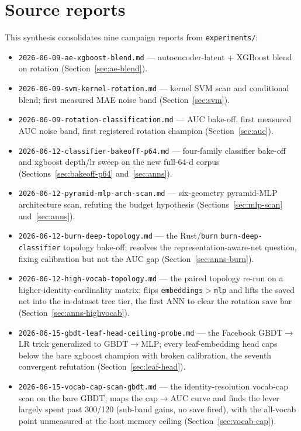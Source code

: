 \documentclass[11pt]{article}
\begin{document}
\section{Source reports}
This synthesis consolidates nine campaign reports from \texttt{experiments/}:
\begin{itemize}
  \item \texttt{2026-06-09-ae-xgboost-blend.md} --- autoencoder-latent +
    XGBoost blend on rotation (Section~\ref{sec:ae-blend}).
  \item \texttt{2026-06-09-svm-kernel-rotation.md} --- kernel SVM scan and
    conditional blend; first measured MAE noise band (Section~\ref{sec:svm}).
  \item \texttt{2026-06-09-rotation-classification.md} --- AUC bake-off, first
    measured AUC noise band, first registered rotation champion
    (Section~\ref{sec:auc}).
  \item \texttt{2026-06-12-classifier-bakeoff-p64.md} --- four-family
    classifier bake-off and xgboost depth/lr sweep on the new full-64-d corpus
    (Sections~\ref{sec:bakeoff-p64} and~\ref{sec:anns}).
  \item \texttt{2026-06-12-pyramid-mlp-arch-scan.md} --- six-geometry
    pyramid-MLP architecture scan, refuting the budget hypothesis
    (Sections~\ref{sec:mlp-scan} and~\ref{sec:anns}).
  \item \texttt{2026-06-12-burn-deep-topology.md} --- the Rust/\texttt{burn}
    \texttt{burn-deep-classifier} topology bake-off; resolves the
    representation-aware-net question, fixing calibration but not the AUC gap
    (Section~\ref{sec:anns-burn}).
  \item \texttt{2026-06-12-high-vocab-topology.md} --- the paired topology
    re-run on a higher-identity-cardinality matrix; flips
    \texttt{embeddings}$>$\texttt{mlp} and lifts the saved net into the
    in-dataset tree tier, the first ANN to clear the rotation save bar
    (Section~\ref{sec:anns-highvocab}).
  \item \texttt{2026-06-15-gbdt-leaf-head-ceiling-probe.md} --- the Facebook
    GBDT$\to$LR trick generalized to GBDT$\to$MLP; every leaf-embedding head
    caps below the bare xgboost champion with broken calibration, the seventh
    convergent refutation (Section~\ref{sec:leaf-head}).
  \item \texttt{2026-06-15-vocab-cap-scan-gbdt.md} --- the identity-resolution vocab-cap scan on the bare GBDT; maps the cap$\to$AUC curve and finds the lever largely spent past 300/120 (sub-band gains, no save fired), with the all-vocab point unmeasured at the host memory ceiling (Section~\ref{sec:vocab-cap}).
\end{itemize}
\end{document}
